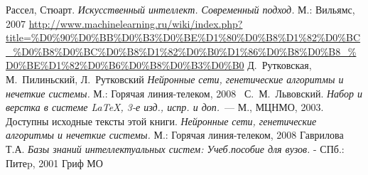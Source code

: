 \renewcommand{\bibname}{Список источников}
\begin{thebibliography}{2010}


	Рассел, Стюарт.   {\em Искусственный интеллект. Современный подход.}    М.:  Вильямс,  2007
\url{http://www.machinelearning.ru/wiki/index.php?title=%D0%90%D0%BB%D0%B3%D0%BE%D1%80%D0%B8%D1%82%D0%BC_%D0%B8%D0%BC%D0%B8%D1%82%D0%B0%D1%86%D0%B8%D0%B8_%D0%BE%D1%82%D0%B6%D0%B8%D0%B3%D0%B0}
	Д.~Рутковская, М.~Пилиньский, Л.~Рутковский {\em Нейронные сети, генетические алгоритмы и нечеткие системы.} М.: Горячая линия-телеком, 2008
	~С.~М.~Львовский.
{\em Набор и верстка в системе \LaTeX, 3-е изд., испр. и доп.}~---
М., МЦНМО, 2003. Доступны исходные тексты этой книги. {\em Нейронные сети, генетические алгоритмы и нечеткие системы.} М.: Горячая линия-телеком, 2008
	Гаврилова Т.А.   {\em Базы знаний интеллектуальных систем: Учеб.пособие для вузов.} -  СПб.:  Питеp,  2001   Гриф МО

\end{thebibliography}

\endinput
